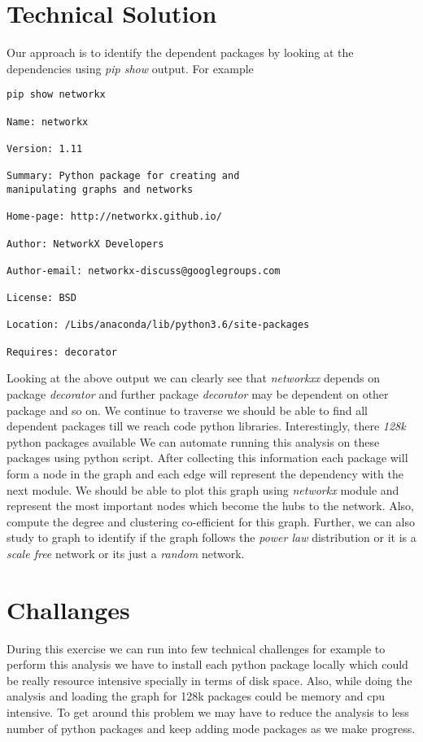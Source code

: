 \section{Technical Solution} \label{techsoln}
 Our approach is to identify the dependent packages by looking
 at the dependencies using \textit{pip show} output. For example
 \begin{lstlisting}
pip show networkx

Name: networkx

Version: 1.11

Summary: Python package for creating and 
manipulating graphs and networks

Home-page: http://networkx.github.io/

Author: NetworkX Developers

Author-email: networkx-discuss@googlegroups.com

License: BSD

Location: /Libs/anaconda/lib/python3.6/site-packages

Requires: decorator
 \end{lstlisting}
 Looking at the above output we can clearly see that \textit{networkxx}
 depends on package \textit{decorator} and further package \textit{decorator}
 may be dependent on other package and so on. We continue to traverse
 we should be able to find all dependent packages till we reach code python
 libraries. Interestingly, there \textit{128k} python packages available \cite{www-python-org}
 We can automate running this analysis on these packages using python script. After 
 collecting this information each package will form a node in the graph and each
 edge will represent the dependency with the next module. We should be able
 to plot this graph using \textit{networkx} module and represent the most important nodes
 which become the hubs to the network. Also, compute the degree and clustering 
 co-efficient for this graph. Further, we can also study to graph to identify if the graph 
 follows the \textit{power law} distribution or it is a \textit{scale free} network or its
 just a \textit{random} network.
  
\section{Challanges} \label{techchallanges}
During this exercise we can run into few technical challenges for example
to perform this analysis we have to install each python package locally
which could be really resource intensive specially in terms of disk space.
Also, while doing the analysis and loading the graph for 128k packages
could be memory and cpu intensive. To get around this problem we may 
have to reduce the analysis to less number of python packages and keep
adding mode packages as we make progress.